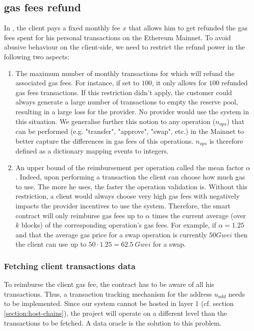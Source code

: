 \subsection{gas fees refund} \label{section:refund}

In {\projectName}, the client pays a fixed monthly fee $x$ that allows him to get refunded the gas fees spent for his personal transactions on the Ethereum Mainnet. 
To avoid abusive behaviour on the client-side, we need to restrict the refund power in the following two aspects:
\begin{enumerate}
    \item The maximum number of monthly transactions for which {\projectName} will refund the associated gas fees. For instance, if set to $100$, it only allows for $100$ refunded gas fees transactions. If this restriction didn't apply, the customer could always generate a large number of transactions to empty the reserve pool, resulting in a large loss for the provider. No provider would use the system in this situation. We generalise further this notion to any operation ($n_{ops}$) that can be performed (e.g. "transfer", "approve", "swap", etc.) in the Mainnet to better capture the differences in gas fees of this operations. $n_{ops}$ is therefore defined as a dictionary mapping events to integers. 
    \item An upper bound of the reimbursement per operation called the mean factor $\alpha$. Indeed, upon performing a transaction the client can choose how much gas to use. The more he uses, the faster the operation validation is. Without this restriction, a client would always choose very high gas fees with negatively impacts the provider incentives to use the system. Therefore, the smart contract will only reimburse gas fees up to $\alpha$ times the current average (over $k$ blocks) of the corresponding operation's gas fees. For example, if $\alpha=1.25$ and that the average gas price for a swap operation is currently $50Gwei$ then the client can use up to $50\cdot1.25=62.5\:Gwei$ for a swap.
\end{enumerate}

\subsubsection{Fetching client transactions data} \label{section:oracle}

To reimburse the client gas fee, the contract has to be aware of all his transactions. Thus, a transaction tracking mechanism for the address $u_{add}$ needs to be implemented. Since our system cannot be hosted in layer 1 (cf. section \ref{section:host-chains}), the project will operate on a different level than the transactions to be fetched. A data oracle\cite{ethereumfoundationDecentralizedOraclesReliably2018} is the solution to this problem.

